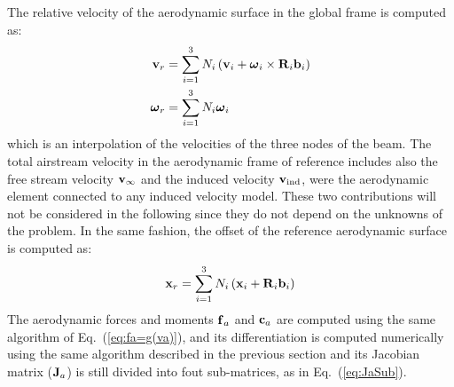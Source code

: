 The relative velocity of the aerodynamic surface in the global
frame is computed as:
\begin{align}
	\bm{\mathbf{v}}_r &= \sum_{i=1}^3 N_i \left( \bm{\mathbf{v}}_i 
		+ \bm{\mathbf{\omega}}_i\times\bm{\mathbf{R}}_i\bm{\mathbf{b}}_i \right)\\
	\bm{\mathbf{\omega}}_r &= \sum_{i=1}^3 N_i \bm{\mathbf{\omega}}_i 
\end{align}
which is an interpolation of the velocities of the three nodes
of the beam.  
The total airstream velocity in the aerodynamic frame of reference 
includes also the free stream velocity $\bm{\mathbf{v}}_{\infty}$ and
the induced velocity $\bm{\mathbf{v}}_{\text{ind}}$, were the aerodynamic element
connected to any induced velocity model.
These two contributions will not be considered in the following
since they do not depend on the unknowns of the problem.  
In the same fashion, the offset of the reference 
aerodynamic surface is computed as:
\begin{equation}
	\bm{\mathbf{x}}_r = \sum_{i=1}^3 N_i \left( \bm{\mathbf{x}}_i 
		+ \bm{\mathbf{R}}_i\bm{\mathbf{b}}_i \right)
\end{equation}
The aerodynamic forces and moments $\bm{\mathbf{f}}_a$ and $\bm{\mathbf{c}}_a$
are computed using the same algorithm of Eq.~(\ref{eq:fa=g(va)}), 
and its differentiation is computed numerically using the same 
algorithm described in the previous section and its Jacobian matrix
($\bm{\mathbf{J}}_{a}$) is still divided into fout sub-matrices, as in 
Eq.~(\ref{eq:JaSub}).

